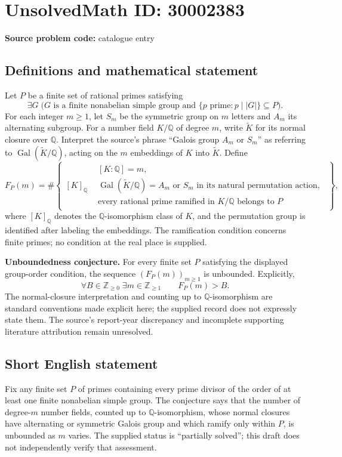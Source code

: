 \documentclass[11pt]{article}
\newcommand{\Z}{\mathbb{Z}}
\newcommand{\Q}{\mathbb{Q}}
\begin{document}
\section*{UnsolvedMath ID: 30002383}
\textbf{Source problem code:} catalogue entry
\subsection{Definitions and mathematical statement}
Let \(P\) be a finite set of rational primes satisfying
\[
\exists G\;\bigl(G\text{ is a finite nonabelian simple group and }\{p\text{ prime}:p\mid |G|\}\subseteq P\bigr).
\]
For each integer \(m\geq 1\), let \(S_m\) be the symmetric group on \(m\) letters and \(A_m\) its alternating subgroup. For a number field \(K/\Q\) of degree \(m\), write \(\widetilde K\) for its normal closure over \(\Q\). Interpret the source's phrase ``Galois group \(A_m\) or \(S_m\)'' as referring to \(\operatorname{Gal}(\widetilde K/\Q)\), acting on the \(m\) embeddings of \(K\) into \(\widetilde K\). Define
\[
F_P(m)=\#\left\{\begin{array}{l|l}
[K]_{\Q} & \begin{gathered}
[K:\Q]=m,\\
\operatorname{Gal}(\widetilde K/\Q)=A_m\text{ or }S_m
\text{ in its natural permutation action},\\
\text{every rational prime ramified in }K/\Q\text{ belongs to }P
\end{gathered}
\end{array}\right\},
\]
where \([K]_{\Q}\) denotes the \(\Q\)-isomorphism class of \(K\), and the permutation group is identified after labeling the embeddings. The ramification condition concerns finite primes; no condition at the real place is supplied.

\textbf{Unboundedness conjecture.} For every finite set \(P\) satisfying the displayed group-order condition, the sequence \((F_P(m))_{m\geq1}\) is unbounded. Explicitly,
\[
\forall B\in\Z_{\geq0}\;\exists m\in\Z_{\geq1}\qquad F_P(m)>B.
\]
The normal-closure interpretation and counting up to \(\Q\)-isomorphism are standard conventions made explicit here; the supplied record does not expressly state them. The source's report-year discrepancy and incomplete supporting literature attribution remain unresolved.
\subsection{Short English statement}
Fix any finite set \(P\) of primes containing every prime divisor of the order of at least one finite nonabelian simple group. The conjecture says that the number of degree-\(m\) number fields, counted up to \(\Q\)-isomorphism, whose normal closures have alternating or symmetric Galois group and which ramify only within \(P\), is unbounded as \(m\) varies. The supplied status is ``partially solved''; this draft does not independently verify that assessment.
\end{document}
